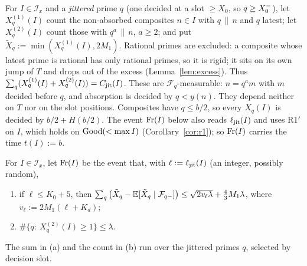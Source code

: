 For $I\in\mathcal I_x$ and a \emph{jittered} prime $q$ (one decided at a slot $\ge X_0$, so $q\ge X_0^{-}$), let $X^{(1)}_q(I)$ count
the non-absorbed composites $n\in I$ with $q\,\|\,n$ and $q$ latest; let $X^{(2)}_q(I)$ count those with $q^a\,\|\,n$, $a\ge2$;
and put $\tilde X_q:=\min(X^{(1)}_q(I),2M_1)$. Rational primes are excluded: a composite whose latest prime is rational has
only rational primes, so it is rigid; it sits on its own jump of $T$ and drops out of the excess (Lemma~\ref{lem:excess}). Thus
$\sum_q(X^{(1)}_q(I)+X^{(2)}_q(I))=C_{\mathrm{jit}}(I)$.
These are $\mathcal F_q$-measurable: $n=q^a m$ with $m$ decided before $q$, and absorption is decided by $q<y(n)$. They
depend neither on $T$ nor on the slot positions. Composites have $q\le b/2$, so every $X_q(I)$ is decided by $b/2+H(b/2)$.
The event $\mathrm{Fr}(I)$ below also reads $\ell_{\mathrm{jit}}(I)$ and uses R1$'$ on $I$, which holds on $\mathrm{Good}(<\max I)$
(Corollary~\ref{cor:r1}); so $\mathrm{Fr}(I)$ carries the time $t(I):=b$.

For $I\in\mathcal I_x$, let $\mathrm{Fr}(I)$ be the event that, with $\ell:=\ell_{\mathrm{jit}}(I)$ (an integer, possibly random),
\begin{enumerate}[label=\textup{(\alph*)}]
\item if $\ell\le K_0+5$, then $\sum_q\big(\tilde X_q-\mathbb{E}[\tilde X_q\mid\mathcal F_{q-}]\big)\le\sqrt{2v_\ell\lambda}+\tfrac43M_1\lambda$, where
  $v_\ell:=2M_1(\ell+K_d)$;
\item $\#\{q:\ X^{(2)}_q(I)\ge1\}\le\lambda$.
\end{enumerate}
The sum in (a) and the count in (b) run over the jittered primes $q$, selected by decision slot.

